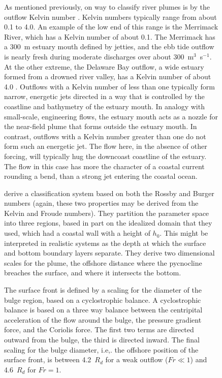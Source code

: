 \documentclass[11pt]{report}
\numberwithin{equation}{section}
\begin{document}
\begin{figure}
As mentioned previously, on way to classify river plumes is by the outflow Kelvin number \citep{garvine:95}.  Kelvin numbers typically range from about 0.1 to 4.0.  An example of the low end of this range is the Merrimack River, which has a Kelvin number of about 0.1.  The Merrimack has a 300~m estuary mouth defined by jetties, and the ebb tide outflow is nearly fresh during moderate discharges over about 300~m$^3$~s$^{-1}$.  At the other extreme, the Delaware Bay outflow, a wide estuary formed from a drowned river valley, has a Kelvin number of about 4.0 \citep{garvine:95}.  Outflows with a Kelvin number of less than one typically form narrow, energetic jets directed in a way that is controlled by the coastline and bathymetry of the estuary mouth.  In analogy with small-scale, engineering flows, the estuary mouth acts as a nozzle for the near-field plume that forms outside the estuary mouth.  In contrast, outflows with a Kelvin number greater than one do not form such an energetic jet.  The flow here, in the absence of other forcing, will typically hug the downcoast coastline of the estuary.  The flow in this case has more the character of a coastal current rounding a bend, than a strong jet entering the coastal ocean.

\citet{yankovsky.chapman:97} derive a classification system based on both the Rossby and Burger numbers (again, these two properties may be derived from the Kelvin and Froude numbers).  They partition the parameter space into three regions, based in part on the idealized domain that they used, which had a coastal wall with a height of $h_0$.  This might be interpreted in realistic systems as the depth at which the surface and bottom boundary layers separate.  They derive two dimensional scales for the plume, the offshore distance where the pycnocline breaches the surface, and where it intersects the bottom.  

The surface front is defined by a scaling for the diameter of the bulge region, based on a cyclostrophic balance.  A cyclostrophic balance is based on a three way balance between the centripital acceleration of the flow around the bulge,  the pressure gradient force, and the Coriolis force.  The first two terms are directed outward from the bulge, the third is directed inward.  The final scaling for the bulge diameter, i.e,. the offshore position of the surface front, is between 4.2~$R_d$ for a weak outflow ($Fr\ll1$) and 4.6~$R_d$ for $Fr=1$.


\end{figure}
\end{document}
